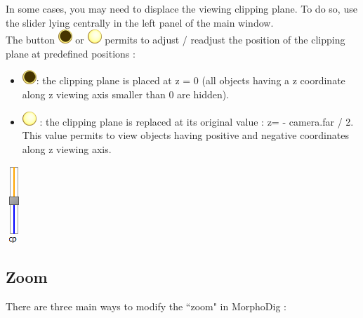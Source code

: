 \begin{minipage}{0.7\textwidth}
In some cases, you may need to displace the viewing clipping plane. To do so, use
the slider lying centrally in the left panel of the main window.\\

The button \includegraphics[scale=0.7]{images/06/camera/cpon.png} or \includegraphics[scale=0.7]{images/06/camera/cpoff.png}  permits to adjust / readjust the position of the clipping plane at predefined positions :
\begin{itemize}
\item  \includegraphics[scale=0.7]{images/06/camera/cpon.png}: the clipping plane is placed at z = 0 (all objects having a z coordinate along
z viewing axis smaller than 0 are hidden).
\item	\includegraphics[scale=0.7]{images/06/camera/cpoff.png} : the clipping plane is replaced at its original value : z= - camera.far / 2. This value permits to
view objects having positive and negative coordinates along z viewing axis.

\end{itemize}
\end{minipage}    
\begin{minipage}{0.25\textwidth}\centering
  \includegraphics[scale=0.5]{images/06/camera/cp_slider.png}
 \end{minipage}   




\subsection{Zoom}
There are three main ways to modify the ``zoom" in MorphoDig :


